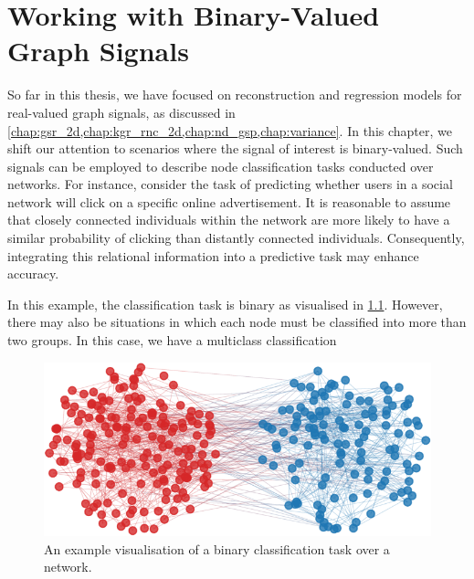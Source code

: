\chapter{Working with Binary-Valued Graph Signals} %

\label{chap:binary} 


So far in this thesis, we have focused on reconstruction and regression models for real-valued graph signals, as discussed in \cref{chap:gsr_2d,chap:kgr_rnc_2d,chap:nd_gsp,chap:variance}. In this chapter, we shift our attention to scenarios where the signal of interest is binary-valued. Such signals can be employed to describe node classification tasks conducted over networks. For instance, consider the task of predicting whether users in a social network will click on a specific online advertisement. It is reasonable to assume that closely connected individuals within the network are more likely to have a similar probability of clicking than distantly connected individuals. Consequently, integrating this relational information into a predictive task may enhance accuracy.

In this example, the classification task is binary as visualised in \cref{fig:binary_class_graph}. However, there may also be situations in which each node must be classified into more than two groups. In this case, we have a multiclass classification


\begin{figure}[t] 
    \begin{center}
        \includegraphics[width=0.8\linewidth]{Figures/2class_graph.pdf}
    \end{center}
   \caption[Visualisation of a binary classification task over a network]{An example visualisation of a binary classification task over a network.} 
    \label{fig:binary_class_graph}
\end{figure} 

